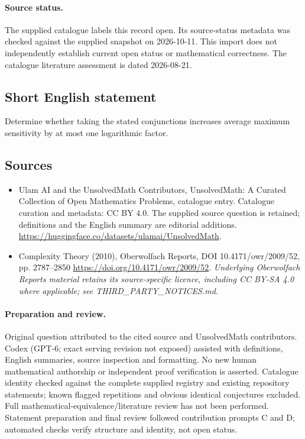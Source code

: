 \documentclass[11pt]{article}
\begin{document}
\paragraph{Source status.}
The supplied catalogue labels this record open. Its source-status metadata was checked against the supplied snapshot on 2026-10-11. This import does not independently establish current open status or mathematical correctness. The catalogue literature assessment is dated 2026-08-21.
\subsection{Short English statement}
Determine whether taking the stated conjunctions increases average maximum sensitivity by at most one logarithmic factor.
\subsection{Sources}
\begin{itemize}
\item[S1] Ulam AI and the UnsolvedMath Contributors, UnsolvedMath: A Curated Collection of Open Mathematics Problems, catalogue entry. Catalogue curation and metadata: CC BY 4.0. The supplied source question is retained; definitions and the English summary are editorial additions.
\url{https://huggingface.co/datasets/ulamai/UnsolvedMath}.
\item[S2] Complexity Theory (2010), Oberwolfach Reports, DOI 10.4171/owr/2009/52, pp. 2787--2850
\url{https://doi.org/10.4171/owr/2009/52}.
\textit{Underlying Oberwolfach Reports material retains its source-specific licence, including CC BY-SA 4.0 where applicable; see THIRD\_PARTY\_NOTICES.md.}
\end{itemize}
\paragraph{Preparation and review.}
Original question attributed to the cited source and UnsolvedMath contributors. Codex (GPT-6; exact serving revision not exposed) assisted with definitions, English summaries, source inspection and formatting. No new human mathematical authorship or independent proof verification is asserted. Catalogue identity checked against the complete supplied registry and existing repository statements; known flagged repetitions and obvious identical conjectures excluded. Full mathematical-equivalence/literature review has not been performed. Statement preparation and final review followed contribution prompts C and D; automated checks verify structure and identity, not open status.
\label{end:statement}
\end{document}
